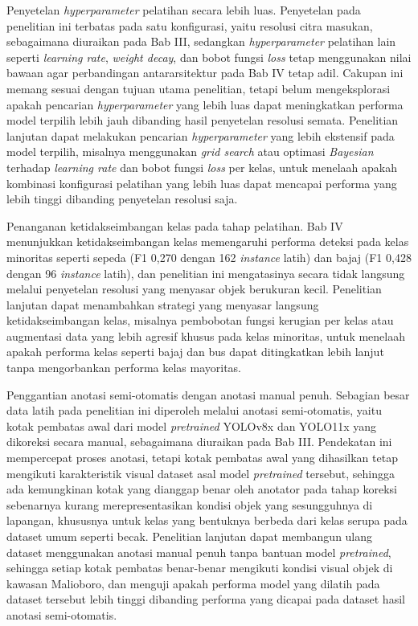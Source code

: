 Penyetelan \textit{hyperparameter} pelatihan secara lebih luas. Penyetelan pada 
penelitian ini terbatas pada satu konfigurasi, yaitu resolusi citra masukan, sebagaimana 
diuraikan pada Bab III, sedangkan \textit{hyperparameter} pelatihan lain seperti 
\textit{learning rate}, \textit{weight decay}, dan bobot fungsi \textit{loss} tetap 
menggunakan nilai bawaan agar perbandingan antararsitektur pada Bab IV tetap adil. 
Cakupan ini memang sesuai dengan tujuan utama penelitian, tetapi belum mengeksplorasi 
apakah pencarian \textit{hyperparameter} yang lebih luas dapat meningkatkan performa model 
terpilih lebih jauh dibanding hasil penyetelan resolusi semata. Penelitian lanjutan dapat 
melakukan pencarian \textit{hyperparameter} yang lebih ekstensif pada model terpilih, 
misalnya menggunakan \textit{grid search} atau optimasi \textit{Bayesian} terhadap \textit{learning rate} 
dan bobot fungsi \textit{loss} per kelas, untuk menelaah apakah kombinasi konfigurasi 
pelatihan yang lebih luas dapat mencapai performa yang lebih tinggi dibanding 
penyetelan resolusi saja.

Penanganan ketidakseimbangan kelas pada tahap pelatihan. Bab IV menunjukkan 
ketidakseimbangan kelas memengaruhi performa deteksi pada kelas minoritas seperti sepeda 
(F1 0,270 dengan 162 \textit{instance} latih) dan bajaj (F1 0,428 dengan 96 \textit{instance} 
latih), dan penelitian ini mengatasinya secara tidak langsung melalui penyetelan resolusi 
yang menyasar objek berukuran kecil. Penelitian lanjutan dapat menambahkan strategi yang 
menyasar langsung ketidakseimbangan kelas, misalnya pembobotan fungsi kerugian per kelas 
atau augmentasi data yang lebih agresif khusus pada kelas minoritas, untuk menelaah apakah 
performa kelas seperti bajaj dan bus dapat ditingkatkan lebih lanjut tanpa mengorbankan 
performa kelas mayoritas.

Penggantian anotasi semi-otomatis dengan anotasi manual penuh. Sebagian besar data 
latih pada penelitian ini diperoleh melalui anotasi semi-otomatis, yaitu kotak pembatas 
awal dari model \textit{pretrained} YOLOv8x dan YOLO11x yang dikoreksi secara manual, 
sebagaimana diuraikan pada Bab III. Pendekatan ini mempercepat proses anotasi, tetapi kotak 
pembatas awal yang dihasilkan tetap mengikuti karakteristik visual dataset asal model 
\textit{pretrained} tersebut, sehingga ada kemungkinan kotak yang dianggap benar oleh 
anotator pada tahap koreksi sebenarnya kurang merepresentasikan kondisi objek yang 
sesungguhnya di lapangan, khususnya untuk kelas yang bentuknya berbeda dari kelas serupa 
pada dataset umum seperti becak. Penelitian lanjutan dapat membangun ulang dataset 
menggunakan anotasi manual penuh tanpa bantuan model \textit{pretrained}, sehingga setiap 
kotak pembatas benar-benar mengikuti kondisi visual objek di kawasan Malioboro, dan menguji 
apakah performa model yang dilatih pada dataset tersebut lebih tinggi dibanding performa 
yang dicapai pada dataset hasil anotasi semi-otomatis.

